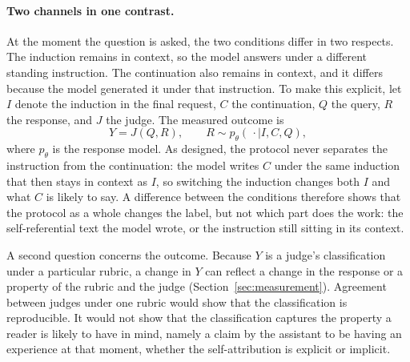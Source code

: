 \documentclass[11pt]{article}
\begin{document}
\paragraph{Two channels in one contrast.}
At the moment the question is asked, the two conditions differ in two
respects. The induction remains in context, so the model answers under a
different standing instruction. The continuation also remains in context,
and it differs because the model generated it under that instruction. To
make this explicit, let $I$ denote the induction in the final request, $C$
the continuation, $Q$ the query, $R$ the response, and $J$ the judge. The
measured outcome is
\begin{equation}
  Y=J(Q,R),\qquad R\sim p_{\theta}(\,\cdot\mid I,C,Q),
  \label{eq:endpoint}
\end{equation}
where $p_\theta$ is the response model. As designed, the protocol never
separates the instruction from the continuation: the model writes $C$ under
the same induction that then stays in context as $I$, so switching the
induction changes both $I$ and what $C$ is likely to say. A difference between
the conditions therefore shows that the protocol as a whole changes the
label, but not which part does the work: the self-referential text the model
wrote, or the instruction still sitting in its context.

A second question concerns the outcome. Because $Y$ is a judge's
classification under a particular rubric, a change in $Y$ can reflect a
change in the response or a property of the rubric and the judge
(Section~\ref{sec:measurement}). Agreement between judges under one rubric would
show that the classification is reproducible. It would not show that the
classification captures the property a reader is likely to have in mind,
namely a claim by the assistant to be having an experience at that moment,
whether the self-attribution is explicit or implicit.
\end{document}
